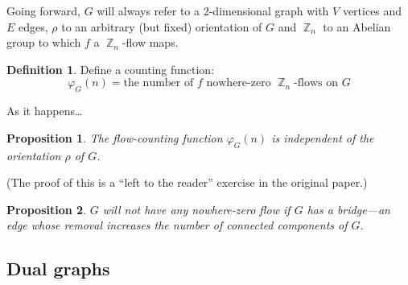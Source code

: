 \documentclass{amsart}
\DeclareMathOperator{\Z}{\mathbb{Z}}
\theoremstyle{plain}
\newtheorem*{prop}{Proposition}
\theoremstyle{remark}
\theoremstyle{definition}
\newtheorem*{definition*}{Definition}
\newenvironment{definition}%
	{\begin{leftbar}\begin{definition*}
}{%
	\end{definition*}\end{leftbar}
}
\begin{document}
Going forward, $G$ will always refer to a 2-dimensional graph with $V$ vertices
and $E$ edges, $\rho$ to an arbitrary (but fixed) orientation of $G$
and $\Z_n$ to an Abelian group to which $f$ a $\Z_n$-flow maps.
\begin{definition}
  Define a counting function:
  \[
    \varphi_G(n)=\text{the number of $f$ nowhere-zero $\Z_n$-flows on $G$}
  \] 
\end{definition}
As it happens\ldots
\begin{prop}
  The flow-counting function $\varphi_G(n)$ is independent of the orientation
  $\rho$ of $G$.
\end{prop}
(The proof of this is a ``left to the reader'' exercise in the original paper.)
\begin{prop}
  $G$ will not have any nowhere-zero flow if $G$ has a \emph{bridge}---an edge
  whose removal increases the number of connected components of $G$.
\end{prop}

\subsection{Dual graphs}
\end{document}
